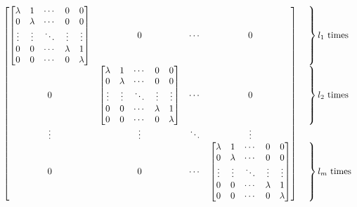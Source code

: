 $$
\begin{bmatrix}
    \begin{bmatrix}
        \lambda & 1 & \cdots & 0 &0 \\
        0 &\lambda & \cdots &0 &0\\
        \vdots &\vdots  &\ddots &\vdots &\vdots \\
        0 &0 &\cdots &\lambda &1 \\
        0 &0 &\cdots &0 &\lambda
    \end{bmatrix}
    &0 & \cdots &0 \\
    0  &\begin{bmatrix}
    \lambda & 1 & \cdots &0 &0 \\
    0 &\lambda & \cdots &0 &0\\
    \vdots &\vdots  &\ddots &\vdots &\vdots \\
    0 &0 &\cdots &\lambda &1 \\
    0 &0 &\cdots &0 &\lambda
    \end{bmatrix}
    & \cdots &0 \\
    \vdots &\vdots &\ddots &\vdots \\
    0 &0 &\cdots &\begin{bmatrix}
                    \lambda & 1 & \cdots &0 &0 \\
                     0 &\lambda & \cdots &0 &0\\
                     \vdots &\vdots  &\ddots &\vdots &\vdots \\
                    0 &0 &\cdots &\lambda &1 \\
                    0 &0 &\cdots &0 &\lambda
                    \end{bmatrix}
\end{bmatrix}
\begin{array}[c]{@{}l@{\,}l}
    \left.\begin{array}{c} 
    \vphantom{0}  \\ \vphantom{0} \\ \vphantom{\vdots} \\ \vphantom{0} \\ \vphantom{0} 
    \end{array} \right\} & \text{$l_1$ times} \\
    \left. \begin{array}{c}
        \vphantom{0}  \\ \vphantom{0} \\ \vphantom{\vdots} \\ \vphantom{0} \\ \vphantom{0}
    \end{array} \right\} & \text{$l_2$ times} \\
    \vphantom{\vdots} \\
    \left. \begin{array}{c} 
        \vphantom{0}  \\ \vphantom{0} \\ \vphantom{\vdots} \\ \vphantom{0} \\ \vphantom{0}
    \end{array} \right\} & \text{$l_m$ times}
\end{array}
$$
